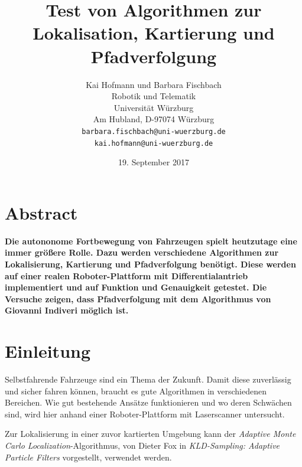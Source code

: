 \documentclass[11pt,a4paper]{article}
\begin{document}
\sloppy

\title{\Large\bf Test von Algorithmen zur Lokalisation, Kartierung und Pfadverfolgung }

\author{Kai Hofmann und Barbara Fischbach\\
  Robotik und Telematik \\
  Universit\"at W\"urzburg\\
  Am Hubland, D-97074 W\"urzburg\\
{\small \texttt{barbara.fischbach@uni-wuerzburg.de}}\\
{\small \texttt{kai.hofmann@uni-wuerzburg.de}}}

\date{19. September 2017}



\maketitle


\newpage

\twocolumn

\section*{Abstract}


	\textbf{Die autononome Fortbewegung von Fahrzeugen spielt heutzutage eine immer gr\"o\ss{}ere Rolle. Dazu werden verschiedene Algorithmen zur Lokalisierung, Kartierung und Pfadverfolgung ben\"otigt. Diese werden auf einer realen Roboter-Plattform mit Differentialantrieb implementiert und auf Funktion und Genauigkeit getestet. Die Versuche zeigen, dass Pfadverfolgung mit dem Algorithmus von Giovanni Indiveri m\"oglich ist. }

\section{Einleitung}
	Selbstfahrende Fahrzeuge sind ein Thema der Zukunft. Damit diese zuverl\"assig und sicher fahren k\"onnen, braucht es gute Algorithmen in verschiedenen Bereichen. Wie gut bestehende Ans\"atze funktionieren und wo deren Schw\"achen sind, wird hier anhand einer Roboter-Plattform mit Laserscanner untersucht. 

	Zur Lokalisierung in einer zuvor kartierten Umgebung kann der \textit{Adaptive Monte Carlo Localization}-Algorithmus, von Dieter Fox in \textit{KLD-Sampling: Adaptive Particle Filters} \cite{amclPaper} vorgestellt, verwendet werden. 
	
\end{document}
